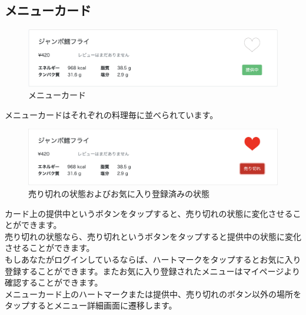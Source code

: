 \documentclass[a4paper]{jsarticle}
\begin{document}
\subsection{メニューカード}
\begin{figure}[htbp]
\centering
	\includegraphics[scale = 0.2]{image/menucard.png}
	\caption{メニューカード}
\end{figure}

メニューカードはそれぞれの料理毎に並べられています。\\
\begin{figure}[htbp]
\centering
	\includegraphics[scale = 0.2]{image/menucard2.png}
	\caption{売り切れの状態およびお気に入り登録済みの状態}
\end{figure}
カード上の提供中というボタンをタップすると、売り切れの状態に変化させることができます。\\
売り切れの状態なら、売り切れというボタンをタップすると提供中の状態に変化させることができます。\\
もしあなたがログインしているならば、ハートマークをタップするとお気に入り登録することができます。またお気に入り登録されたメニューはマイページより確認することができます。\\
メニューカード上のハートマークまたは提供中、売り切れのボタン以外の場所をタップするとメニュー詳細画面に遷移します。
\newpage
\end{document}
